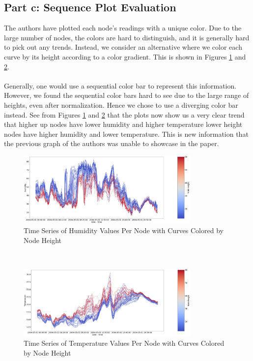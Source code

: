 \documentclass[11pt, letterpaper]{article}
\begin{document}
\subsection{Part c: Sequence Plot Evaluation}
The authors have plotted each node's readings with a unique color. Due to the large number of nodes, the colors are hard to distinguish, and it is generally hard to pick out any trends. Instead, we consider an alternative where we color each curve by its height according to a color gradient. This is shown in Figures \ref{fig:graph_crtique_c1} and \ref{fig:graph_crtique_c2}.
\\
\\
Generally, one would use a sequential color bar to represent this information. However, we found the sequential color bars hard to see due to the large range of heights, even after normalization. Hence we chose to use a diverging color bar instead. See from Figures \ref{fig:graph_crtique_c1} and \ref{fig:graph_crtique_c2} that the plots now show us a very clear trend that higher up nodes have lower humidity and higher temperature lower height nodes have higher humidity and lower temperature.  This is new information that the previous graph of the authors was unable to showcase in the paper.
\begin{figure}[h!]
\centering
\captionsetup{justification=centering}
\includegraphics[width=0.8\textwidth]{Report Images/fig8_graph_critique_c1.png}
\caption{Time Series of Humidity Values Per Node with Curves Colored by Node Height}
\label{fig:graph_crtique_c1}
\end{figure}
\\
\begin{figure}[h!]
\centering
\captionsetup{justification=centering}
\includegraphics[width=0.8\textwidth]{Report Images/fig8_graph_critique_c2.png}
\caption{Time Series of Temperature Values Per Node with Curves Colored by Node Height}
\label{fig:graph_crtique_c2}
\end{figure}
\end{document}
